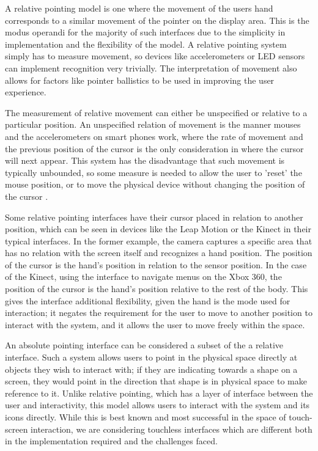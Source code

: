 A relative pointing model is one where the movement of the users hand corresponds to a similar movement of the pointer on the display area. This is the modus operandi for the majority of such interfaces due to the simplicity in implementation and the flexibility of the model. A relative pointing system simply has to measure movement, so devices like accelerometers or LED sensors can implement recognition very trivially. The interpretation of movement also allows for factors like pointer ballistics to be used in improving the user experience.

The measurement of relative movement can either be unspecified or relative to a particular position. An unspecified relation of movement is the manner mouses and the accelerometers on smart phones work, where the rate of movement and the previous position of the cursor is the only consideration in where the cursor will next appear. This system has the disadvantage that such movement is typically unbounded, so some measure is needed to allow the user to 'reset' the mouse position, or to move the physical device without changing the position of the cursor .

Some relative pointing interfaces have their cursor placed in relation to another position, which can be seen in devices like the Leap Motion or the Kinect in their typical interfaces. In the former example, the camera captures a specific area that has no relation with the screen itself and recognizes a hand position. The position of the cursor is the hand's position in relation to the sensor position. In the case of the Kinect, using the interface to navigate menus on the Xbox 360, the position of the cursor is the hand's position relative to the rest of the body. This gives the interface additional flexibility, given the hand is the mode used for interaction; it negates the requirement for the user to move to another position to interact with the system, and it allows the user to move freely within the space.

An absolute pointing interface can be considered a subset of the a relative interface. Such a system allows users to point in the physical space directly at objects they wish to interact with; if they are indicating towards a shape on a screen, they would point in the direction that shape is in physical space to make reference to it. Unlike relative pointing, which has a layer of interface between the user and interactivity, this model allows users to interact with the system and its icons directly. While this is best known and most successful in the space of touch-screen interaction, we are considering touchless interfaces which are different both in the implementation required and the challenges faced. 

